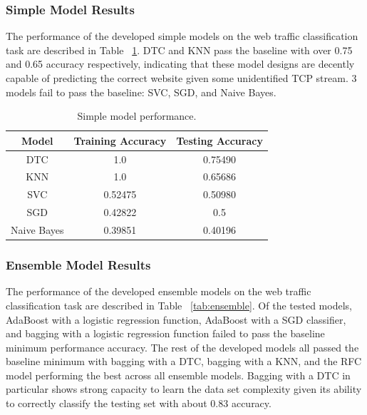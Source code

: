 \documentclass[10pt,sigconf,letterpaper,nonacm]{acmart}
\begin{document}
\subsubsection{Simple Model Results}

The performance of the developed simple models on the web traffic classification task are described in Table ~\ref{tab:simple}.
DTC and KNN pass the baseline with over 0.75 and 0.65 accuracy respectively, indicating that these model designs are decently capable of predicting the correct website given some unidentified TCP stream.
3 models fail to pass the baseline: SVC, SGD, and Naive Bayes.

\begin{table}[h]
  \caption{Simple model performance.}
  \label{tab:simple}
  \begin{tabular}{ccc}
    \toprule
    Model & Training Accuracy & Testing Accuracy \\
    \midrule
    DTC & 1.0 & 0.75490 \\
    KNN & 1.0 & 0.65686 \\
    SVC & 0.52475 & 0.50980 \\
    SGD & 0.42822 & 0.5 \\
    Naive Bayes & 0.39851 & 0.40196 \\
    \bottomrule
  \end{tabular}
\end{table}

\subsubsection{Ensemble Model Results}

The performance of the developed ensemble models on the web traffic classification task are described in Table ~\ref{tab:ensemble}.
Of the tested models, AdaBoost with a logistic regression function, AdaBoost with a SGD classifier, and bagging with a logistic regression function failed to pass the baseline minimum performance accuracy.
The rest of the developed models all passed the baseline minimum with bagging with a DTC, bagging with a KNN, and the RFC model performing the best across all ensemble models.
Bagging with a DTC in particular shows strong capacity to learn the data set complexity given its ability to correctly classify the testing set with about 0.83 accuracy. 
\end{document}
